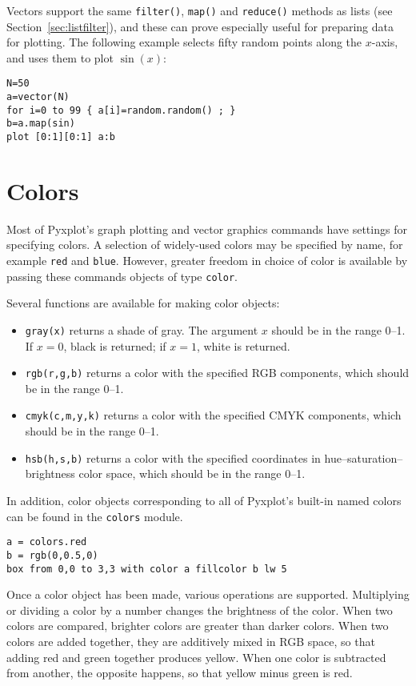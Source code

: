 Vectors support the same {\tt filter()}, {\tt map()} and {\tt reduce()} methods
as lists (see Section~\ref{sec:listfilter}), and these can prove especially
useful for preparing data for plotting. The following example selects fifty
random points along the $x$-axis, and uses them to plot $\sin(x)$:

\begin{verbatim}
N=50
a=vector(N)
for i=0 to 99 { a[i]=random.random() ; }
b=a.map(sin)
plot [0:1][0:1] a:b
\end{verbatim}

\section{Colors}

Most of Pyxplot's graph plotting and vector graphics commands have settings for
specifying colors. A selection of widely-used colors may be specified by name,
for example {\tt red} and {\tt blue}. However, greater freedom in choice of
color is available by passing these commands objects of type {\tt color}.

Several functions are available for making color objects:

\begin{itemize}
\item {\tt gray(x)} returns a shade of gray. The argument $x$ should be in the range 0--1. If $x=0$, black is returned; if $x=1$, white is returned.
\item {\tt rgb(r,g,b)} returns a color with the specified RGB components, which should be in the range 0--1.
\item {\tt cmyk(c,m,y,k)} returns a color with the specified CMYK components, which should be in the range 0--1.
\item {\tt hsb(h,s,b)} returns a color with the specified coordinates in hue--saturation--brightness color space, which should be in the range 0--1.
\end{itemize}

\noindent In addition, color objects corresponding to all of Pyxplot's built-in
named colors can be found in the {\tt colors} module.

\begin{verbatim}
a = colors.red
b = rgb(0,0.5,0)
box from 0,0 to 3,3 with color a fillcolor b lw 5
\end{verbatim}

Once a color object has been made, various operations are supported.
Multiplying or dividing a color by a number changes the brightness of the
color. When two colors are compared, brighter colors are greater than darker
colors. When two colors are added together, they are additively mixed in RGB
space, so that adding red and green together produces yellow. When one color is
subtracted from another, the opposite happens, so that yellow minus green is
red.

